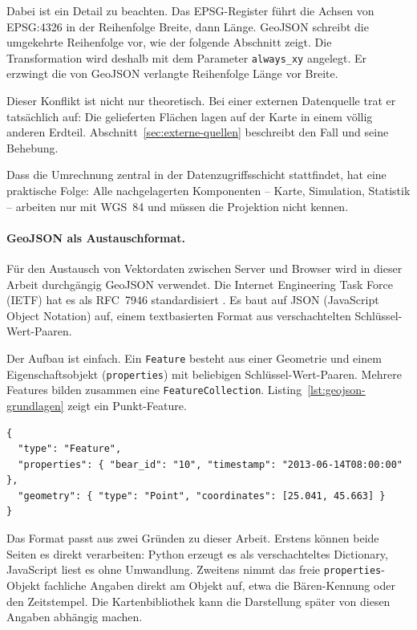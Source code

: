 \documentclass[12pt,a4paper]{report}
\begin{document}
Dabei ist ein Detail zu beachten. Das EPSG-Register führt die Achsen von EPSG:4326 in der
Reihenfolge Breite, dann Länge. GeoJSON schreibt die umgekehrte Reihenfolge vor, wie der
folgende Abschnitt zeigt. Die Transformation wird deshalb mit dem Parameter
\texttt{always\_xy} angelegt. Er erzwingt die von GeoJSON verlangte Reihenfolge Länge vor
Breite.

Dieser Konflikt ist nicht nur theoretisch. Bei einer externen Datenquelle trat er
tatsächlich auf: Die gelieferten Flächen lagen auf der Karte in einem völlig anderen
Erdteil. Abschnitt~\ref{sec:externe-quellen} beschreibt den Fall und seine Behebung.

Dass die Umrechnung zentral in der Datenzugriffsschicht stattfindet, hat eine praktische
Folge: Alle nachgelagerten Komponenten -- Karte, Simulation, Statistik -- arbeiten nur mit
WGS~84 und müssen die Projektion nicht kennen.

\paragraph{GeoJSON als Austauschformat.}
\label{subsec:geojson}

Für den Austausch von Vektordaten zwischen Server und Browser wird in dieser Arbeit
durchgängig GeoJSON verwendet. Die Internet Engineering Task Force (IETF) hat es als
RFC~7946 standardisiert \cite{RFC7946}. Es baut auf JSON (JavaScript Object Notation) auf,
einem textbasierten Format aus verschachtelten Schlüssel-Wert-Paaren.

Der Aufbau ist einfach. Ein \texttt{Feature} besteht aus einer Geometrie und einem
Eigenschaftsobjekt (\texttt{properties}) mit beliebigen Schlüssel-Wert-Paaren. Mehrere
Features bilden zusammen eine \texttt{Feature\-Collection}.
Listing~\ref{lst:geojson-grundlagen} zeigt ein Punkt-Feature.

\begin{lstlisting}[caption={Aufbau eines GeoJSON-Punkt-Features},
                   label={lst:geojson-grundlagen}]
{
  "type": "Feature",
  "properties": { "bear_id": "10", "timestamp": "2013-06-14T08:00:00" },
  "geometry": { "type": "Point", "coordinates": [25.041, 45.663] }
}
\end{lstlisting}

Das Format passt aus zwei Gründen zu dieser Arbeit. Erstens können beide Seiten es direkt
verarbeiten: Python erzeugt es als verschachteltes Dictionary, JavaScript liest es ohne
Umwandlung. Zweitens nimmt das freie \texttt{properties}-Objekt fachliche Angaben direkt am
Objekt auf, etwa die Bären-Kennung oder den Zeitstempel. Die Kartenbibliothek kann die
Darstellung später von diesen Angaben abhängig machen.
\end{document}
